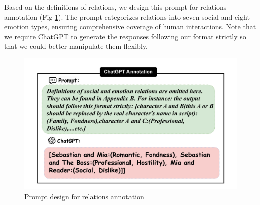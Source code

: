 Based on the definitions of relations, we design this prompt for relations annotation (Fig \ref{fig:prompt}). The prompt categorizes relations into seven social and eight emotion types, ensuring comprehensive coverage of human interactions. Note that we require ChatGPT to generate the responses following our format strictly so that we could better manipulate them flexibly. 

\begin{figure}[ht]
	\centering
	\includegraphics[width=\linewidth]{images/prompt.pdf}
	\caption{Prompt design for relations annotation}
	\label{fig:prompt}
\end{figure}

